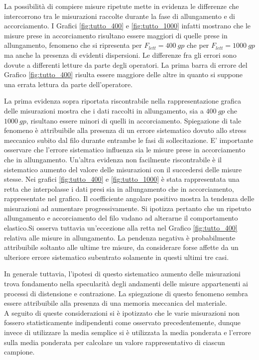 \documentclass[a4paper,11pt,oneside]{article}
\begin{document}
La possibilità di compiere misure ripetute mette in evidenza le differenze che intercorrono tra le misurazioni raccolte durante la fase di allungamento e di accorciamento. I Grafici \ref{fig:tutto_400} e \ref{fig:tutto_1000} infatti mostrano che le misure prese in accorciamento risultano essere maggiori di quelle prese in allungamento, fenomeno che si ripresenta per $F_{lett}=\SI{400}{gp}$ che per $F_{lett}=\SI{1000}{gp}$ ma anche la presenza di evidenti dispersioni. Le differenze fra gli errori sono dovute a differenti letture da parte degli operatori. La prima barra di errore del Grafico \ref{fig:tutto_400} risulta essere maggiore delle altre in quanto si suppone una errata lettura da parte dell'operatore.

La prima evidenza sopra riportata riscontrabile nella rappresentazione grafica delle misurazioni mostra che i dati raccolti in allungamento, sia a $\SI{400}{gp}$ che $\SI{1000}{gp}$, risultano essere minori di quelli in accorciamento. Spiegazione di tale fenomeno è attribuibile alla presenza di un errore sistematico dovuto allo stress meccanico subito dal filo durante entrambe le fasi di sollecitazione. E' importante osservare che l'errore sistematico influenza sia le misure prese in accorciamento che in allungamento.
Un'altra evidenza non facilmente riscontrabile è il sistematico aumento del valore delle misurazioni con il succedersi delle misure stesse. Nei grafici \ref{fig:tutto_400} e \ref{fig:tutto_1000} è stata rappresentata una retta che interpolasse i dati presi sia in allungamento che in accorciamento, rappresentate nel grafico. Il coefficiente angolare positivo mostra la tendenza delle misurazioni ad aumentare progressivamente. Si ipotizza pertanto che un ripetuto allungamento e accorciamento del filo vadano ad alterarne il comportamento elastico.Si osserva tuttavia un'eccezione alla retta nel Grafico \ref{fig:tutto_400} relativa alle misure in allungamento. La pendenza negativa è probabilmente attribuibile soltanto alle ultime tre misure, da considerare forse affette da un ulteriore errore sistematico subentrato solamente in questi ultimi tre casi.

In generale tuttavia, l'ipotesi di questo sistematico aumento delle misurazioni trova fondamento nella specularità degli andamenti delle misure appartenenti ai processi di distensione e contrazione. La spiegazione di questo fenomeno sembra essere attribuibile alla presenza di una memoria meccanica del materiale.\\

A seguito di queste considerazioni si è ipotizzato che le varie misurazioni non fossero statisticamente indipendenti come osservato precedentemente, dunque invece di utilizzare la media semplice si è utilizzata la media ponderata e l'errore sulla media ponderata per calcolare un valore rappresentativo di ciascun campione.
\end{document}
